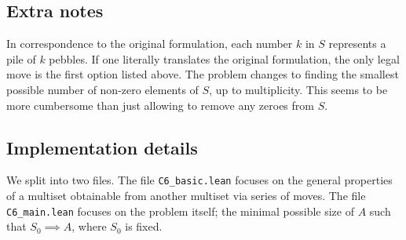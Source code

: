 \documentclass{article}
\begin{document}
\subsection*{Extra notes}

In correspondence to the original formulation, each number $k$ in $S$ represents a pile of $k$ pebbles.
If one literally translates the original formulation, the only legal move is the first option listed above.
The problem changes to finding the smallest possible number of non-zero elements of $S$, up to multiplicity.
This seems to be more cumbersome than just allowing to remove any zeroes from $S$.



\subsection*{Implementation details}

We split into two files.
The file \texttt{C6_basic.lean} focuses on the general properties of a multiset obtainable from another multiset via series of moves.
The file \texttt{C6_main.lean} focuses on the problem itself; the minimal possible size of $A$ such that $S_0 \implies A$, where $S_0$ is fixed.
\end{document}
